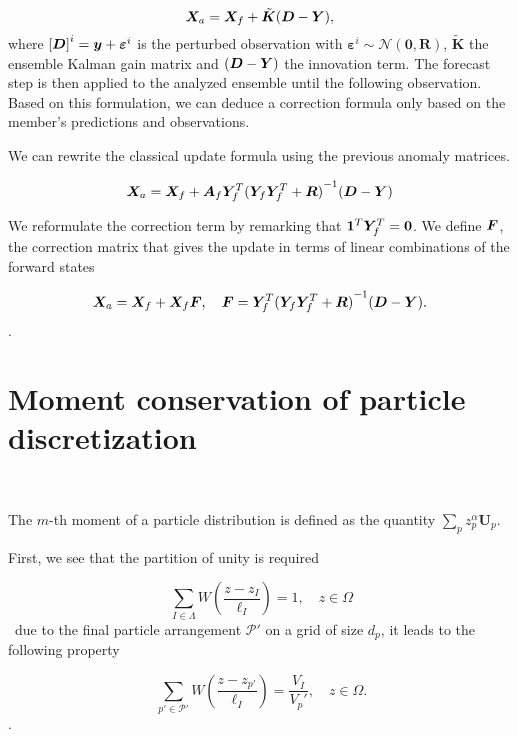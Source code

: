 \begin{equation} \label{enkf_formula}
    \bm{X}_a = \bm{X}_f + \tilde{\bm{K}} ( \bm{D} - \bm{Y}),
\end{equation}where ${[\bm{D}]}^i = \bm{y} + \bm{\varepsilon}^i$ is the perturbed observation with $\bm{\varepsilon}^i \sim \mathcal{N}(\bm{0}, \bm R) $, $\tilde{\bm{K}}$ the ensemble Kalman gain matrix and $( \bm{D} - \bm{Y})$ the innovation term.
The forecast step is then applied to the analyzed ensemble until the following observation.
Based on this formulation, we can deduce a correction formula only based on the member's predictions and observations.

We can rewrite the classical update formula using the previous anomaly matrices.

\begin{equation*}
    \bm{X}_a = \bm{X}_f + \bm A_f \bm Y_f^T {({\bm Y_f \bm Y_f^T + \bm R})}^{-1}(\bm{D} - \bm{Y})
\end{equation*}

We reformulate the correction term by remarking that $ \bm{1}^T  \bm Y_f^T = \bm{0}$. We define $\bm{F}$, the correction matrix that gives the update in terms of linear combinations of the forward states

\begin{equation}
    \bm{X}_a = \bm{X}_f + \bm{X}_f \bm{F}, \quad \bm{F} = \bm Y_f^T {(\bm Y_f \bm Y_f^T + \bm R)}^{-1}(\bm{D} - \bm{Y}).
\end{equation}.

\section{Moment conservation of particle discretization}~\label{appendix:moment_conservation}

The $m$-th moment of a particle distribution is defined as the quantity $\sum_{p} z_p^{\alpha} \bm{U}_p$.

First, we see that the partition of unity is required

\begin{equation}~\label{eq:unity1}
    \sum_{I \in \Lambda} W\left(\frac{z - z_I}{\ell_I}\right) = 1 ,\quad z \in \Omega
\end{equation}~due to the final particle arrangement $\mathcal{P'}$ on a grid of size $d_p$, it leads to the following property

\begin{equation}~\label{eq:unity2}
    \sum_{p'\in\mathcal P'} W\left(\frac{z - z_{p'}}{\ell_I}\right) = \frac{V_I}{V_p'},\quad z \in \Omega.
\end{equation}.

